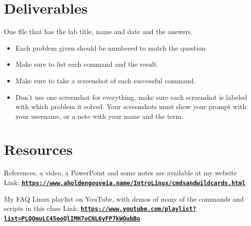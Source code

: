 \documentclass[12pt]{article}
\begin{document}
\section*{Deliverables}
One file that has the lab title, name and date and the answers.  
\begin{itemize}
    \item Each problem given should be numbered to match the question
    \item Make sure to list each command and the result.  \item Make sure to take a screenshot of each successful command.  
    \item Don't use one screenshot for everything, make sure each screenshot is labeled with which problem it solved. Your screenshots must show your prompt with your username, or a note with your name and the term.
\end{itemize}
\section*{Resources}
References, a video, a PowerPoint and some notes are available at my website
Link: \href{https://www.aholdengouveia.name/IntroLinux/cmdsandwildcards.html}{\textbf{\nolinkurl{https://www.aholdengouveia.name/IntroLinux/cmdsandwildcards.html}}}

My FAQ Linux playlist on YouTube, with demos of many of the commands and scripts in this class
Link: \href{https://www.youtube.com/playlist?list=PLQOmuLC45eoQlIMH7oCNL6yFP7kWQubBo}{\textbf{\nolinkurl{https://www.youtube.com/playlist?list=PLQOmuLC45eoQlIMH7oCNL6yFP7kWQubBo}}}
\end{document}
